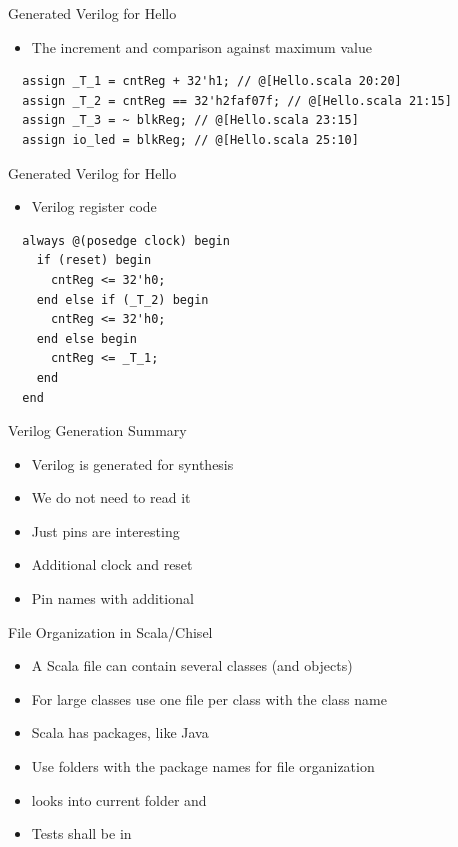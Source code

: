 \begin{frame}[fragile]{Generated Verilog for Hello}
\begin{itemize}
\item The increment and comparison against maximum value
\end{itemize}
\begin{verbatim}
  assign _T_1 = cntReg + 32'h1; // @[Hello.scala 20:20]
  assign _T_2 = cntReg == 32'h2faf07f; // @[Hello.scala 21:15]
  assign _T_3 = ~ blkReg; // @[Hello.scala 23:15]
  assign io_led = blkReg; // @[Hello.scala 25:10]
\end{verbatim}
\end{frame}

\begin{frame}[fragile]{Generated Verilog for Hello}
\begin{itemize}
\item Verilog register code
\end{itemize}
\begin{verbatim}
  always @(posedge clock) begin
    if (reset) begin
      cntReg <= 32'h0;
    end else if (_T_2) begin
      cntReg <= 32'h0;
    end else begin
      cntReg <= _T_1;
    end
  end
\end{verbatim}
\end{frame}

\begin{frame}[fragile]{Verilog Generation Summary}
\begin{itemize}
\item Verilog is generated for synthesis
\item We do not need to read it
\item Just pins are interesting
\item Additional clock and reset
\item Pin names with additional 
\end{itemize}
\end{frame}

\begin{frame}[fragile]{File Organization in Scala/Chisel}
\begin{itemize}
\item A Scala file can contain several classes (and objects)
\item For large classes use one file per class with the class name
\item Scala has packages, like Java
\item Use folders with the package names for file organization
\item {} looks into current folder and 
\item Tests shall be in 
\end{itemize}
\end{frame}

